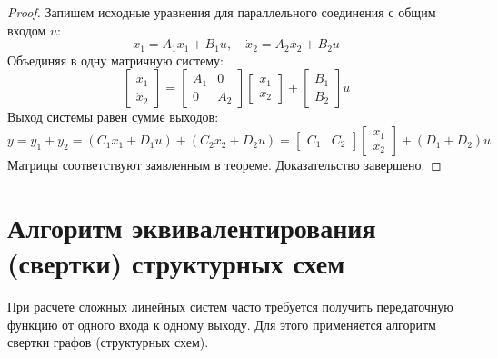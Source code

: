 \documentclass[12pt,a4paper]{article}
\begin{document}
\begin{proof}
    Запишем исходные уравнения для параллельного соединения с общим входом $u$:
    \begin{equation}
        \dot{x}_1 = A_1 x_1 + B_1 u, \quad \dot{x}_2 = A_2 x_2 + B_2 u
    \end{equation}
    Объединяя в одну матричную систему:
    \begin{equation}
        \begin{bmatrix} \dot{x}_1 \\ \dot{x}_2 \end{bmatrix} =
        \begin{bmatrix} A_1 & 0 \\ 0 & A_2 \end{bmatrix} \begin{bmatrix} x_1 \\ x_2 \end{bmatrix} +
        \begin{bmatrix} B_1 \\ B_2 \end{bmatrix} u
    \end{equation}
    Выход системы равен сумме выходов:
    \begin{equation}
        y = y_1 + y_2 = (C_1 x_1 + D_1 u) + (C_2 x_2 + D_2 u) =
        \begin{bmatrix} C_1 & C_2 \end{bmatrix} \begin{bmatrix} x_1 \\ x_2 \end{bmatrix} + (D_1 + D_2)u
    \end{equation}
    Матрицы соответствуют заявленным в теореме. Доказательство завершено.
\end{proof}

\section{Алгоритм эквивалентирования (свертки) структурных схем}

При расчете сложных линейных систем часто требуется получить передаточную функцию от одного входа к одному выходу. Для этого применяется алгоритм свертки графов (структурных схем).
\end{document}
